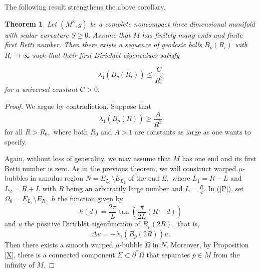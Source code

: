 \documentclass[10pt,a4paper]{amsart}
\newtheorem{theorem}{Theorem}[section]
\numberwithin{equation}{section}
\begin{document}
The following result strengthens the above corollary.


\begin{theorem}
Let $\left( M^{3},g\right) $ be a complete noncompact three dimensional manifold with
scalar curvature $S\geq 0.$ Assume that $M$ has finitely many ends and
finite first Betti number. Then there exists a sequence of geodesic balls $B_p(R_i)$ with
$R_{i}\rightarrow \infty $ such that their first Dirichlet eigenvalues satisfy
 
\begin{equation*}
\lambda _{1}\left( B_{p}\left( R_{i}\right) \right) \leq \frac{C}{R_{i}^{2}}
\end{equation*}%
for a universal constant $C>0.$
\end{theorem}

\begin{proof}
We argue by contradiction. Suppose that
\begin{equation}
\lambda _{1}\left( B_{p}\left( R\right) \right) \geq \frac{A}{R^{2}}
\label{m1}
\end{equation}
for all $R>R_{0},$ where both $R_0$ and $A>1$ are constants as large as one wants to specify.

Again, without loss of generality, we may assume that $M$ has one end and its first
Betti number is zero. As in the previous theorem, 
we will construct warped
$\mu$-bubbles in annulus region $N=E_{L_1}\setminus E_{L_2}$ of the end $E,$
where $L_1=R-L$ and $L_2=R+L$ with $R$ being an arbitrarily large number and $L=\frac{R}{4}.$ 
In (\ref{P}), set $\Omega_0=E_{L_1}\setminus E_{R},$ $h$ the function given by
\begin{equation*}
h\left( d\right) =\frac{2\pi }{L}\tan \left( \frac{\pi }{2L}(R-d)\right)
\end{equation*} 
and $u$ the positive Dirichlet eigenfunction of $B_{p}\left(2R\right),$ that is,
\begin{equation*}
\Delta u=-\lambda _{1}\left( B_{p}\left( 2R\right) \right) u.
\end{equation*}
Then there exists a smooth warped $\mu$-bubble $\Omega$ in $N.$ Moreover, by Proposition \ref{X},
there is a connected component $\Sigma \subset \partial ^{\ast }\Omega $
that separates $p\in M$ from the infinity of $M.$


\end{proof}
\end{document}
